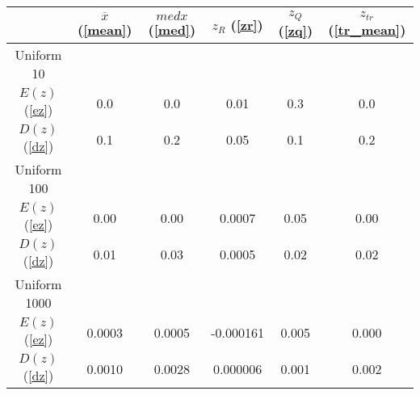 \begin{tabular}{|c|c|c|c|c|c|}
\hline
 & $\overline{x}$ (\ref{mean}) & $med x$ (\ref{med}) & $z_R$ (\ref{zr}) & $z_Q$ (\ref{zq}) & $z_{tr}$ (\ref{tr_mean})\\
\hline
Uniform 10 &  &  &  &  & \\
\hline
$E(z)$ (\ref{ez}) & 0.0 & 0.0 & 0.01 & 0.3 & 0.0\\
\hline
$D(z)$ (\ref{dz}) & 0.1 & 0.2 & 0.05 & 0.1 & 0.2\\
\hline
Uniform 100 &  &  &  &  & \\
\hline
$E(z)$ (\ref{ez}) & 0.00 & 0.00 & 0.0007 & 0.05 & 0.00\\
\hline
$D(z)$ (\ref{dz}) & 0.01 & 0.03 & 0.0005 & 0.02 & 0.02\\
\hline
Uniform 1000 &  &  &  &  & \\
\hline
$E(z)$ (\ref{ez}) & 0.0003 & 0.0005 & -0.000161 & 0.005 & 0.000\\
\hline
$D(z)$ (\ref{dz}) & 0.0010 & 0.0028 & 0.000006 & 0.001 & 0.002\\
\hline
\end{tabular}

